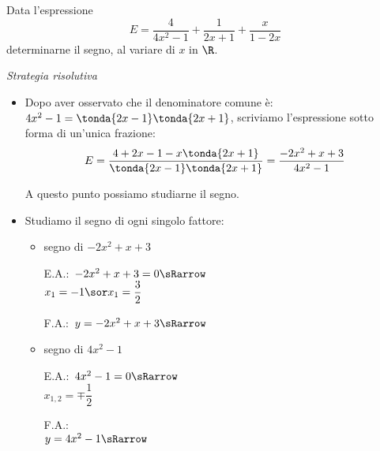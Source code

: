 \begin{esempio}
Data l'espressione
\[E=\dfrac{4}{4x^2-1}+\dfrac {1}{2x+1}+\dfrac{x}{1-2x}\]
determinarne il segno, al variare di \(x\) in \(\R\).

\newpage %

\emph{Strategia risolutiva}
\begin{itemize}

\item Dopo aver osservato che il denominatore comune è:
\(4x^2-1 =\tonda{2x-1}\tonda{2x+1}\), scriviamo
l'espressione sotto forma di un'unica frazione:
\[E=\dfrac{4+2x-1 - x \tonda{2x+1}}{\tonda{2x-1}\tonda{2x+1}} =
\dfrac{-2x^2+x+3}{4x^2-1}\]

A questo punto possiamo studiarne il segno.

 \item Studiamo il segno di ogni singolo fattore:

\begin{itemize}

 \item  segno di \(-2x^2+x+3\)\\
 \begin{minipage}{.35\textwidth}
  E.A.:~\(-2x^2+x+3=0 \sRarrow\)\\
  \(x_1=-1 \sor x_1=\dfrac{3}{2}\)
  \vspace{1.8em}
 \end{minipage}
 \begin{minipage}{.25\textwidth}
  F.A.:~\(y=-2x^2+x+3 \sRarrow \)
  \vspace{1.8em}
 \end{minipage}
 \begin{minipage}{.38\textwidth}
  \begin{inaccessibleblock}
\end{inaccessibleblock}
 \end{minipage}

 \item segno di \(4x^2-1\)\\
 \begin{minipage}{.35\textwidth}
  E.A.:~\(4x^2-1=0 \sRarrow \) \\
  \(x_{1,2}=\mp\dfrac{1}{2}\)
 \end{minipage}
 \begin{minipage}{.25\textwidth}
  F.A.:\\
  \(y=4x^2-1 \sRarrow\)
 \end{minipage}
 \begin{minipage}{.38\textwidth}
  \begin{inaccessibleblock}
\end{inaccessibleblock}
 \end{minipage}


\end{itemize}
\end{itemize}
\end{esempio}
